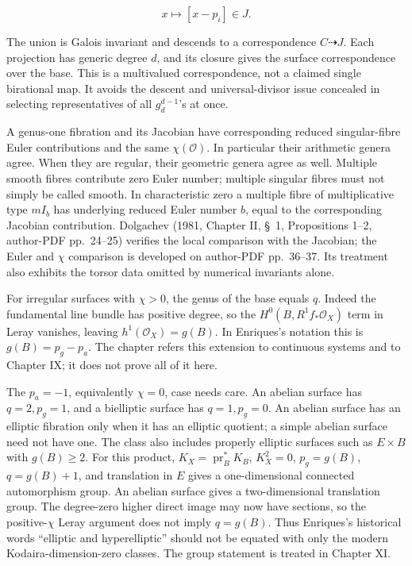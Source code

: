 \[
x\longmapsto[x-p_i]\in J.
\]

The union is Galois invariant and descends to a correspondence \(C\dashrightarrow J\). Each projection has generic degree \(d\), and its closure gives the surface correspondence over the base. This is a multivalued correspondence, not a claimed single birational map. It avoids the descent and universal-divisor issue concealed in selecting representatives of all \(g_d^{d-1}\)'s at once.

A genus-one fibration and its Jacobian have corresponding reduced singular-fibre Euler contributions and the same \(\chi(\mathcal O)\). In particular their arithmetic genera agree. When they are regular, their geometric genera agree as well. Multiple smooth fibres contribute zero Euler number; multiple singular fibres must not simply be called smooth. In characteristic zero a multiple fibre of multiplicative type \(mI_b\) has underlying reduced Euler number \(b\), equal to the corresponding Jacobian contribution. Dolgachev (1981, Chapter II, \S~1, Propositions 1--2, author-PDF pp.~24--25) verifies the local comparison with the Jacobian; the Euler and \(\chi\) comparison is developed on author-PDF pp.~36--37. Its treatment also exhibits the torsor data omitted by numerical invariants alone.

For irregular surfaces with \(\chi>0\), the genus of the base equals \(q\). Indeed the fundamental line bundle has positive degree, so the \(H^0(B,R^1f_*\mathcal O_X)\) term in Leray vanishes, leaving \(h^1(\mathcal O_X)=g(B)\). In Enriques's notation this is \(g(B)=p_g-p_a\). The chapter refers this extension to continuous systems and to Chapter IX; it does not prove all of it here.

The \(p_a=-1\), equivalently \(\chi=0\), case needs care. An abelian surface has \(q=2,p_g=1\), and a bielliptic surface has \(q=1,p_g=0\). An abelian surface has an elliptic fibration only when it has an elliptic quotient; a simple abelian surface need not have one. The class also includes properly elliptic surfaces such as \(E\times B\) with \(g(B)\ge2\). For this product, \(K_X=\operatorname{pr}_B^*K_B\), \(K_X^2=0\), \(p_g=g(B)\), \(q=g(B)+1\), and translation in \(E\) gives a one-dimensional connected automorphism group. An abelian surface gives a two-dimensional translation group. The degree-zero higher direct image may now have sections, so the positive-\(\chi\) Leray argument does not imply \(q=g(B)\). Thus Enriques's historical words ``elliptic and hyperelliptic'' should not be equated with only the modern Kodaira-dimension-zero classes. The group statement is treated in Chapter XI.

